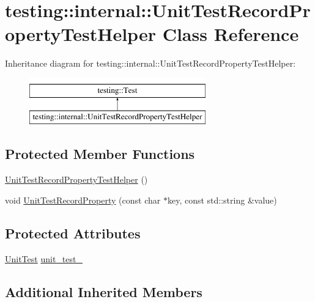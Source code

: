 \hypertarget{classtesting_1_1internal_1_1_unit_test_record_property_test_helper}{\section{testing\-:\-:internal\-:\-:Unit\-Test\-Record\-Property\-Test\-Helper Class Reference}
\label{classtesting_1_1internal_1_1_unit_test_record_property_test_helper}
}
Inheritance diagram for testing\-:\-:internal\-:\-:Unit\-Test\-Record\-Property\-Test\-Helper\-:\begin{figure}[H]
\begin{center}
\leavevmode
\includegraphics[height=2.000000cm]{classtesting_1_1internal_1_1_unit_test_record_property_test_helper}
\end{center}
\end{figure}
\subsection*{Protected Member Functions}
\begin{DoxyCompactItemize}
\item 
\hyperlink{classtesting_1_1internal_1_1_unit_test_record_property_test_helper_aa2bdfe52eb2aab5233ce9118917a4750}{Unit\-Test\-Record\-Property\-Test\-Helper} ()
\item 
void \hyperlink{classtesting_1_1internal_1_1_unit_test_record_property_test_helper_a9c5432d080faf13a1db6baff0a2944f4}{Unit\-Test\-Record\-Property} (const char $\ast$key, const std\-::string \&value)
\end{DoxyCompactItemize}
\subsection*{Protected Attributes}
\begin{DoxyCompactItemize}
\item 
\hyperlink{classtesting_1_1_unit_test}{Unit\-Test} \hyperlink{classtesting_1_1internal_1_1_unit_test_record_property_test_helper_a415e13a354d3b8bd97db96aae5ef5df1}{unit\-\_\-test\-\_\-}
\end{DoxyCompactItemize}
\subsection*{Additional Inherited Members}


